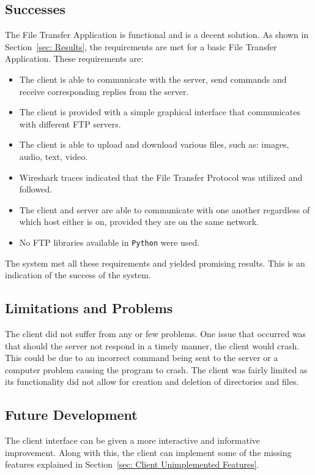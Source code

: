 \documentclass[10pt,twocolumn]{witseiepaper}
\def\code#1{\texttt{#1}}
\begin{document}
\subsection{Successes}
\label{sec: Successes}
The File Transfer Application is functional and is a decent solution. As shown in Section~\ref{sec: Results}, the requirements are met for a basic File Transfer Application. These requirements are:
\begin{itemize}
\item The client is able to communicate with the server, send commands and receive corresponding replies from the server.
\item The client is provided with a simple graphical interface that communicates with different FTP servers.
\item The client is able to upload and download various files, such as: images, audio, text, video.
\item Wireshark traces indicated that the File Transfer Protocol was utilized and followed.
\item The client and server are able to communicate with one another regardless of which host either is on, provided they are on the same network.
\item No FTP libraries available in \code{Python} were used.
\end{itemize}

The system met all these requirements and yielded promising results. This is an indication of the success of the system.


\subsection{Limitations and Problems}
\label{sec: Limitations and Problems}
The client did not suffer from any or few problems. One issue that occurred was that should the server not respond in a timely manner, the client would crash. This could be due to an incorrect command being sent to the server or a computer problem causing the program to crash. The client was fairly limited as its functionality did not allow for creation and deletion of directories and files. 

\subsection{Future Development}
\label{sec: Future Development}
The client interface can be given a more interactive and informative improvement. Along with this, the client can implement some of the missing features explained in Section~\ref{sec: Client Unimplemented Features}.
\end{document}
